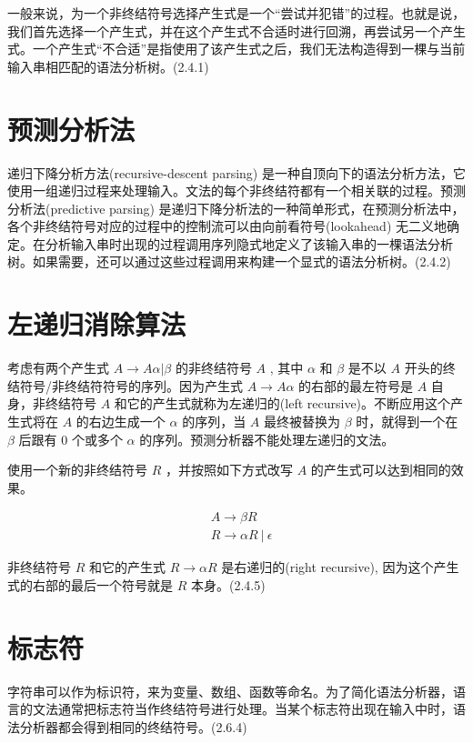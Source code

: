 \documentclass[12pt]{article}
\begin{document}
一般来说，为一个非终结符号选择产生式是一个“尝试并犯错”的过程。也就是说，我们首先选择一个产生式，并在这个产生式不合适时进行回溯，再尝试另一个产生式。一个产生式“不合适”是指使用了该产生式之后，我们无法构造得到一棵与当前输入串相匹配的语法分析树。(2.4.1)


\section*{预测分析法}

递归下降分析方法(recursive-descent parsing) 是一种自顶向下的语法分析方法，它使用一组递归过程来处理输入。文法的每个非终结符都有一个相关联的过程。预测分析法(predictive parsing) 是递归下降分析法的一种简单形式，在预测分析法中，各个非终结符号对应的过程中的控制流可以由向前看符号(lookahead) 无二义地确定。在分析输入串时出现的过程调用序列隐式地定义了该输入串的一棵语法分析树。如果需要，还可以通过这些过程调用来构建一个显式的语法分析树。(2.4.2)


\section*{左递归消除算法}

考虑有两个产生式 $A \rightarrow A \alpha | \beta$ 的非终结符号 $A$ , 其中 $\alpha$ 和 $\beta$ 是不以 $A$ 开头的终结符号/非终结符符号的序列。因为产生式 $A \rightarrow A\alpha$ 的右部的最左符号是 $A$ 自身，非终结符号 $A$ 和它的产生式就称为左递归的(left recursive)。不断应用这个产生式将在 $A$ 的右边生成一个 $\alpha$ 的序列，当 $A$ 最终被替换为 $\beta$ 时，就得到一个在 $\beta$ 后跟有 0 个或多个 $\alpha$ 的序列。预测分析器不能处理左递归的文法。

使用一个新的非终结符号 $R$ ，并按照如下方式改写 $A$ 的产生式可以达到相同的效果。

\begin{align}
& A \rightarrow \beta R \nonumber \\
& R \rightarrow \alpha R\ |\ \epsilon \nonumber
\end{align}

非终结符号 $R$ 和它的产生式 $R \rightarrow \alpha R$ 是右递归的(right recursive), 因为这个产生式的右部的最后一个符号就是 $R$ 本身。(2.4.5)

\section*{标志符}

字符串可以作为标识符，来为变量、数组、函数等命名。为了简化语法分析器，语言的文法通常把标志符当作终结符号进行处理。当某个标志符出现在输入中时，语法分析器都会得到相同的终结符号。(2.6.4)
\end{document}
